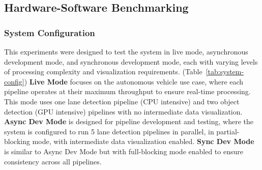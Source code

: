 \documentclass[conference]{IEEEtran}
\begin{document}
\subsection{Hardware-Software Benchmarking}

\subsubsection{System Configuration}

This experiments were designed to test the system in live mode, asynchronous development mode, and synchronous development mode, each with varying levels of processing complexity and visualization requirements. (Table~\ref{tab:system-config})
\textbf{Live Mode} focuses on the autonomous vehicle use case, where each pipeline operates at their maximum throughput to ensure real-time processing.
This mode uses one lane detection pipeline (CPU intensive) and two object detection (GPU intensive) pipelines with no intermediate data visualization.
\textbf{Async Dev Mode} is designed for pipeline development and testing, where the system is configured to run 5 lane detection pipelines in parallel, in partial-blocking mode, with intermediate data visualization enabled.
\textbf{Sync Dev Mode} is similar to Async Dev Mode but with full-blocking mode enabled to ensure consistency across all pipelines.

\begin{table}[h!]
    \centering
    \caption{System Configuration for Different Modes}
    \label{tab:system-config}
\end{table}
\end{document}
